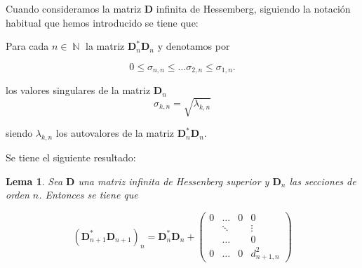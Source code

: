 \documentclass[11pt]{article}
\newtheorem{lem1}{Lema}%
\newenvironment{lem}{\begin{lem1}}{\end{lem1}}
\DeclareMathOperator{\NN}{\mathbb N}%
\begin{document}
\noindent 


\noindent Cuando consideramos la matriz $\mathbf{D}$ infinita de Hessemberg, siguiendo la notación habitual que hemos introducido se tiene que: 

\noindent Para cada $n\in \NN$ la matriz $\mathbf{D}_n^{*}\mathbf{D}_n$  y denotamos por 

$$
0 \leq \sigma_{n,n}\leq \dots \sigma_{2,n} \leq \sigma_{1,n}.
$$

\noindent los valores singulares de la matriz $\mathbf{D}_n$ 
$$
\sigma_{k,n}=\sqrt{\lambda_{k,n}}
$$

\noindent siendo $\lambda_{k,n}$ los autovalores de la matriz $\mathbf{D}_n^{*}\mathbf{D}_n$. 

\noindent Se tiene el siguiente resultado: 


\begin{lem} Sea $\mathbf{D}$ una matriz infinita de Hessenberg superior y $\mathbf{D}_n$ las secciones de orden $n$. Entonces se tiene que 

 $$
(\mathbf{D}_{n+1}^{*}\mathbf{D}_{n+1})_{n} = \mathbf{D}_n^{*}\mathbf{D}_n +\begin{pmatrix}
0 & \dots&0 & 0\\
 & \ddots& & \vdots\\
  & \dots& & 0\\
0 & \dots& 0 & d_{n+1,n}^2

\end{pmatrix}
$$
\end{lem} 
\end{document}
